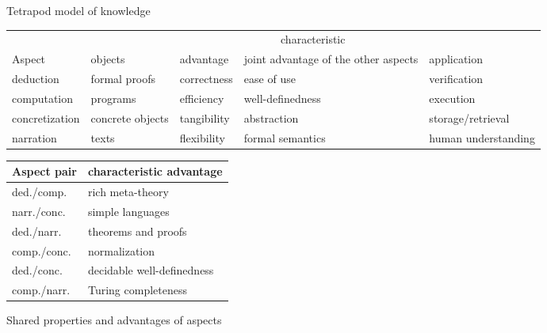 \begin{figure}[hbt]
\begin{center}
\end{center}
\caption{Tetrapod model of knowledge}\label{fig:tetrapod}
\end{figure}

\begin{figure}[htb]\centering\footnotesize\setlength{\tabcolsep}{4pt}
\begin{tabular}{|l|llp{2.1cm}l|}\hline
       & \multicolumn{4}{c|}{characteristic} \\
Aspect &  objects & advantage & joint advantage of the other aspects & application \\\hline
deduction & formal proofs & correctness & ease of use & verification \\
computation & programs & efficiency & well-definedness & execution\\
concretization & concrete objects & tangibility & abstraction & storage/retrieval\\
narration & texts & flexibility & formal semantics & human understanding\\\hline
\end{tabular}
\quad
\begin{tabular}{|l|l|}\hline
Aspect pair & characteristic advantage \\\hline
ded./comp.  & rich meta-theory \\
narr./conc. & simple languages \\\hline
ded./narr.  & theorems and proofs \\
comp./conc. & normalization \\\hline
ded./conc.  & decidable well-definedness \\
comp./narr. & Turing completeness \\\hline
\end{tabular}
\caption{Shared properties and advantages of aspects}\label{fig:tetrapod2}
\end{figure}

